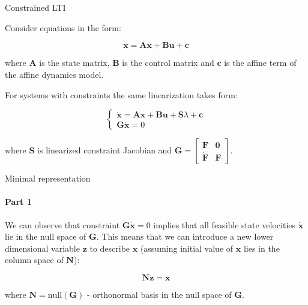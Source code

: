 \documentclass{beamer}
\begin{document}
\begin{frame}{Constrained LTI}
\begin{flushleft}

Consider equations in the form:

\begin{equation}
\label{eq:LTI}
    \dot{\mathbf{x}} = \mathbf{A} \mathbf{x} + \mathbf{B} \mathbf{u} + \mathbf{c}
\end{equation}

where $\mathbf{A}$ is the state matrix, $\mathbf{B}$ is the control matrix and $\mathbf{c}$ is the affine term of the affine dynamics model.

\bigskip

For systems with constraints the same linearization takes form:

\begin{equation}
\label{eq:CLTI}
\begin{cases}
    \dot{\mathbf{x}} = \mathbf{A} \mathbf{x} + \mathbf{B} \mathbf{u} + \mathbf{S} \lambda + \mathbf{c} \\
    \mathbf{G}\dot{\mathbf{x}} = 0
\end{cases}    
\end{equation}

where $\mathbf{S}$ is linearized constraint Jacobian and $\mathbf{G} = \begin{bmatrix} \mathbf{F} & \mathbf{0} \\ \dot{\mathbf{F}} & \mathbf{F} \end{bmatrix}$. 

\end{flushleft}
\end{frame}



\begin{frame}{Minimal representation}
\framesubtitle{Part 1}
\begin{flushleft}

We can observe that constraint $\mathbf{G}\dot{\mathbf{x}} = 0$ implies that all feasible state velocities $\dot{\mathbf{x}}$ lie in the null space of $\mathbf{G}$. This means that we can introduce a new lower dimensional variable $\mathbf{z}$ to describe $\mathbf{x}$ (assuming initial value of $\mathbf{x}$ lies in the column space of $\mathbf{N}$):

\begin{equation}
    \mathbf{N}\mathbf{z} = \mathbf{x}
\end{equation}

where $\mathbf{N} = \text{null}(\mathbf{G})$ - orthonormal basis in the null space of $\mathbf{G}$. 
\end{flushleft}
\end{frame}
\end{document}
